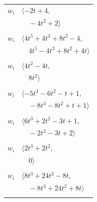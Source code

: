 \documentclass[11pt]{article}
\begin{document}
\begin{longtable}{@{}ll@{}}
$w_i$ & $\langle -2t+4,$\\
 & $\quad -4t^{2}+2\rangle$\\
\addlinespace[2pt]
\multicolumn{2}{@{}p{0.97\textwidth}@{}}{$i=13$, $D_i=4$, $\rho_{ij}$: $0{:}1, \allowbreak 12{:}2, \allowbreak 14{:}1, \allowbreak 15{:}2, \allowbreak 16{:}2, \allowbreak 21{:}2, \allowbreak 27{:}2$}\\
$w_i$ & $\langle 4t^{5}+4t^{3}+8t^{2}-4,$\\
 & $\quad 4t^{5}-4t^{3}+8t^{2}+4t\rangle$\\
\addlinespace[2pt]
\multicolumn{2}{@{}p{0.97\textwidth}@{}}{$i=14$, $D_i=2$, $\rho_{ij}$: $7{:}2, \allowbreak 9{:}1, \allowbreak 12{:}2, \allowbreak 13{:}2, \allowbreak 15{:}1$}\\
$w_i$ & $\langle 4t^{2}-4t,$\\
 & $\quad 8t^{2}\rangle$\\
\addlinespace[2pt]
\multicolumn{2}{@{}p{0.97\textwidth}@{}}{$i=15$, $D_i=2$, $\rho_{ij}$: $0{:}2, \allowbreak 1{:}2, \allowbreak 8{:}1, \allowbreak 11{:}1, \allowbreak 13{:}1, \allowbreak 14{:}2, \allowbreak 19{:}1$}\\
$w_i$ & $\langle -5t^{3}-6t^{2}-t+1,$\\
 & $\quad -8t^{3}-8t^{2}+t+1\rangle$\\
\addlinespace[2pt]
\multicolumn{2}{@{}p{0.97\textwidth}@{}}{$i=16$, $D_i=2$, $\rho_{ij}$: $0{:}1, \allowbreak 2{:}1, \allowbreak 3{:}2, \allowbreak 8{:}2, \allowbreak 11{:}2, \allowbreak 13{:}1$}\\
$w_i$ & $\langle 6t^{3}+2t^{2}-3t+1,$\\
 & $\quad -2t^{2}-3t+2\rangle$\\
\addlinespace[2pt]
\multicolumn{2}{@{}p{0.97\textwidth}@{}}{$i=17$, $D_i=2$, $\rho_{ij}$: $2{:}1, \allowbreak 11{:}1, \allowbreak 21{:}2, \allowbreak 27{:}1$}\\
$w_i$ & $\langle 2t^{3}+2t^{2},$\\
 & $\quad 0\rangle$\\
\addlinespace[2pt]
\multicolumn{2}{@{}p{0.97\textwidth}@{}}{$i=18$, $D_i=2$, $\rho_{ij}$: $0{:}2, \allowbreak 3{:}1, \allowbreak 4{:}1, \allowbreak 6{:}2, \allowbreak 24{:}2, \allowbreak 26{:}1$}\\
$w_i$ & $\langle 8t^{3}+24t^{2}-8t,$\\
 & $\quad -8t^{3}+24t^{2}+8t\rangle$\\
\addlinespace[2pt]
\multicolumn{2}{@{}p{0.97\textwidth}@{}}{$i=19$, $D_i=2$, $\rho_{ij}$: $3{:}2, \allowbreak 5{:}2, \allowbreak 7{:}2, \allowbreak 15{:}2, \allowbreak 24{:}1, \allowbreak 26{:}2$}\\

\end{longtable}
\end{document}
